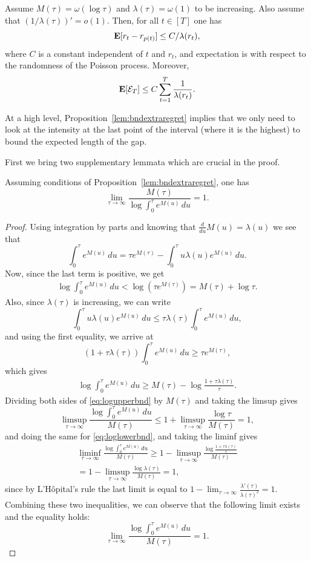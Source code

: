 \begin{proposition}\label{lem:bndextraregret}
    Assume $M(\tau) = \omega(\log \tau)$ and $\lambda(\tau) = \omega(1)$ to be increasing. Also assume that $(1/\lambda(\tau))' = o(1)$. Then, for all $t \in [T]$ one has
    \[
        \mathbf{E}[r_t - r_{p(t)}] \leq C/\lambda(r_t),
    \]
    where $C$ is a constant independent of $t$ and $r_t$, and expectation is with respect to the randomness of the Poisson process. Moreover,
    \[
         \mathbf{E}[\mathcal{E}_T] \leq C\sum_{t=1}^T \frac{1}{\lambda(r_t)}.
    \]
\end{proposition}

At a high level, Proposition~\ref{lem:bndextraregret} implies that we only need to look at the intensity at the last point of the interval (where it is the highest) to bound the expected length of the gap.  

First we bring two supplementary lemmata which are crucial in the proof.
\begin{lemma}\label{lem:suppl1}
  Assuming conditions of Proposition~\ref{lem:bndextraregret}, one has
  \[
    \lim_{\tau\to\infty} \frac{M(\tau)}{\log \int_0^\tau e^{M(u)}\,du} = 1.
  \]
\end{lemma}
\begin{proof}
  Using integration by parts and knowing that $\frac{d}{du}M(u) = \lambda(u)$ we see that
  \[
    \int_0^\tau e^{M(u)}\,du = \tau e^{M(\tau)} - \int_0^\tau u\lambda(u)e^{M(u)}\,du.
  \]
  Now, since the last term is positive, we get
  \begin{align}\label{eq:logupperbnd}
    \log\int_0^\tau e^{M(u)}\,du < \log(\tau e^{M(\tau)}) = M(\tau) + \log \tau.
  \end{align}
  Also, since $\lambda(\tau)$ is increasing, we can write 
  \[
    \int_0^\tau u\lambda(u) e^{M(u)}\,du \leq \tau\lambda(\tau) \int_0^\tau e^{M(u)}\,du,
  \]
  and using the first equality, we arrive at
  \[
    (1 + \tau\lambda(\tau)) \int_0^\tau e^{M(u)}\,du \geq \tau e^{M(\tau)},
  \]
  which gives
  \begin{align}\label{eq:loglowerbnd}
    \log \int_0^\tau e^{M(u)}\,du \geq M(\tau) - \log\frac{1 + \tau\lambda(\tau)}{\tau}.
  \end{align}
  Dividing both sides of \eqref{eq:logupperbnd} by $M(\tau)$ and taking the limsup gives
  \[
    \limsup_{\tau\to\infty} \frac{\log \int_0^\tau e^{M(u)}\,du}{M(\tau)} \leq 1 + \limsup_{\tau\to\infty} \frac{\log \tau}{M(\tau)} = 1, 
  \]
  and doing the same for \eqref{eq:loglowerbnd}, and taking the liminf gives
  \begin{align*}
    \liminf_{\tau\to\infty} \frac{\log \int_0^\tau e^{M(u)}\,du}{M(\tau)} \geq 1 - \limsup_{\tau\to\infty} \frac{\log\frac{1 + \tau\lambda(\tau)}{\tau}}{M(\tau)} \\
    = 1 - \limsup_{\tau\to\infty} \frac{\log\lambda(\tau)}{M(\tau)} = 1, 
  \end{align*}
  since by L'H\^{o}pital's rule the last limit is equal to $1 - \lim_{\tau\to\infty} \frac{\lambda'(\tau)}{\lambda(\tau)^2} = 1$.
  Combining these two inequalities, we can observe that the following limit exists and the equality holds:
  \[
    \lim_{\tau\to\infty} \frac{\log \int_0^\tau e^{M(u)}\,du}{M(\tau)}= 1.
  \]
\end{proof}

